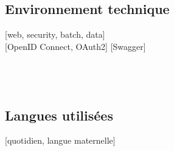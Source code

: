 {    \subsection{Environnement technique}
     [web, security, batch, data]\\
    [OpenID Connect, OAuth2] [Swagger]\\
       \\
         \\
      \\

    \subsection{Langues utilisées}
    [quotidien, langue maternelle]
}

\makebody
\clearpage


\pagestyle{highlightmain}

